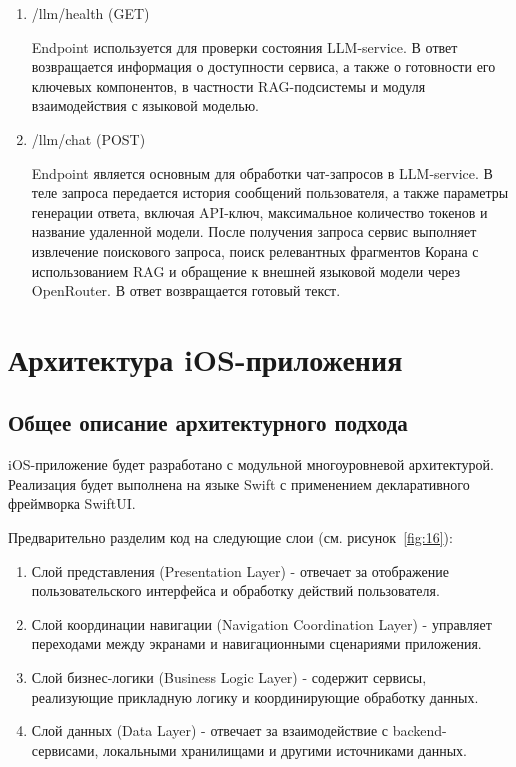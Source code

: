 \begin{enumerate}
	\item /llm/health (GET)

	Endpoint используется для проверки состояния LLM-service. В ответ возвращается информация о доступности сервиса, а также о готовности его ключевых компонентов, в частности RAG-подсистемы и модуля взаимодействия с языковой моделью.

	\item /llm/chat (POST)

	Endpoint является основным для обработки чат-запросов в LLM-service. В теле запроса передается история сообщений пользователя, а также параметры генерации ответа, включая API-ключ, максимальное количество токенов и название удаленной модели. После получения запроса сервис выполняет извлечение поискового запроса, поиск релевантных фрагментов Корана с использованием RAG и обращение к внешней языковой модели через OpenRouter. В ответ возвращается готовый текст.
\end{enumerate}


\section{Архитектура iOS-приложения}


\subsection{Общее описание архитектурного подхода}


iOS-приложение будет разработано с модульной многоуровневой архитектурой. Реализация будет выполнена на языке Swift с применением декларативного фреймворка SwiftUI.


Предварительно разделим код на следующие слои (см. рисунок~\ref{fig:16}):

\begin{enumerate}
	\item Слой представления (Presentation Layer) - отвечает за отображение пользовательского интерфейса и обработку действий пользователя.
	\item Слой координации навигации (Navigation Coordination Layer) - управляет переходами между экранами и навигационными сценариями приложения.
	\item Слой бизнес-логики (Business Logic Layer) - содержит сервисы, реализующие прикладную логику и координирующие обработку данных.
	\item Слой данных (Data Layer) - отвечает за взаимодействие с backend-сервисами, локальными хранилищами и другими источниками данных.
\end{enumerate}

